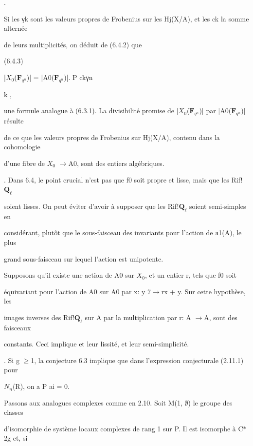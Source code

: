 \documentclass[11pt]{article}
\begin{document}
\noindent .\par
\noindent Si les γk sont les valeurs propres de Frobenius sur les Hj(X/A), et les ck la somme alternée\par
\noindent de leurs multiplicités, on déduit de (6.4.2) que\par
\noindent (6.4.3)\par
\noindent |\(X_0\)(\(\mathbf F_{q^n}\))| = |A0(\(\mathbf F_{q^n}\))|. P ckγn\par
\noindent k ,\par
\noindent une formule analogue à (6.3.1). La divisibilité promise de |\(X_0\)(\(\mathbf F_{q^n}\))| par |A0(\(\mathbf F_{q^n}\))| résulte\par
\noindent de ce que les valeurs propres de Frobenius sur Hj(X/A), contenu dans la cohomologie\par
\noindent d’une fibre de \(X_0\) \(\to\)A0, sont des entiers algébriques.\par
{}. Dans 6.4, le point crucial n’est pas que f0 soit propre et lisse, mais que les Rif!\(\mathbf Q_{\ell}\)\par
\noindent soient lisses. On peut éviter d’avoir à supposer que les Rif!\(\mathbf Q_{\ell}\) soient semi-simples en\par
\noindent considérant, plutôt que le sous-faisceau des invariants pour l’action de π1(A), le plus\par
\noindent grand sous-faisceau sur lequel l’action est unipotente.\par
\noindent Supposons qu’il existe une action de A0 sur \(X_0\), et un entier r, tels que f0 soit\par
\noindent équivariant pour l’action de A0 sur A0 par x: y 7\(\to\)rx + y. Sur cette hypothèse, les\par
\medskip
\noindent images inverses des Rif!\(\mathbf Q_{\ell}\) sur A par la multiplication par r: A \(\to\)A, sont des faisceaux\par
\noindent constants. Ceci implique et leur lissité, et leur semi-simplicité.\par
{}. Si g \(\geq\)1, la conjecture 6.3 implique que dans l’expression conjecturale (2.11.1) pour\par
\noindent \(N_n\)(R), on a P ai = 0.\par
\noindent Passons aux analogues complexes comme en 2.10. Soit M(1, \(\emptyset\)) le groupe des classes\par
\noindent d’isomorphie de système locaux complexes de rang 1 sur P. Il est isomorphe à C\(*\)2g et, si\par
\end{document}
